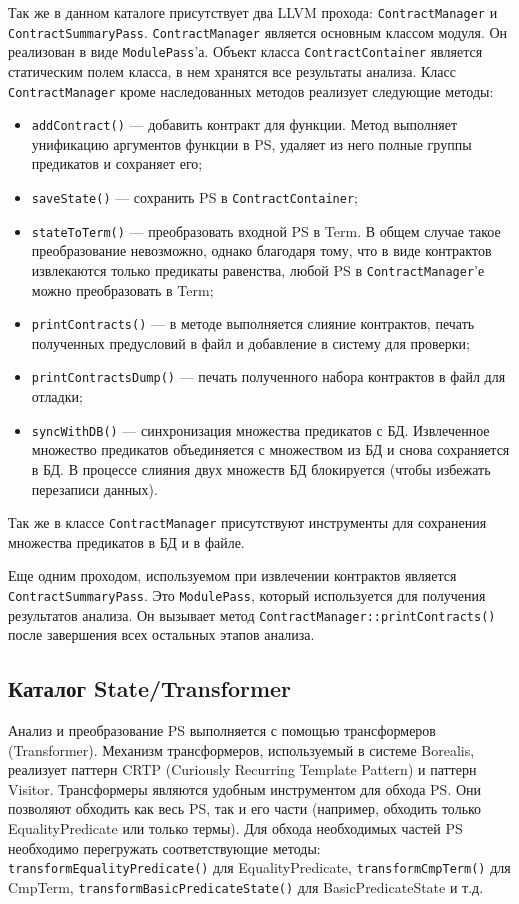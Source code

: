 Так же в данном каталоге присутствует два LLVM прохода: \texttt{ContractManager} и \texttt{ContractSummaryPass}. \texttt{ContractManager} является основным классом модуля. Он реализован в виде \texttt{ModulePass}'а. Объект класса \texttt{ContractContainer} является статическим полем класса, в нем хранятся все результаты анализа. Класс \texttt{ContractManager} кроме наследованных методов реализует следующие методы:
\begin{itemize}
\item \texttt{addContract()} --- добавить контракт для функции. Метод выполняет унификацию аргументов функции в PS, удаляет из него полные группы предикатов и сохраняет его;
\item \texttt{saveState()} --- сохранить PS в \texttt{ContractContainer};
\item \texttt{stateToTerm()} --- преобразовать входной PS в Term. В общем случае такое преобразование невозможно, однако благодаря тому, что в виде контрактов извлекаются только предикаты равенства, любой PS в \texttt{ContractManager}'е можно преобразовать в Term;
\item \texttt{printContracts()} --- в методе выполняется слияние контрактов, печать полученных предусловий в файл и добавление в систему для проверки;
\item \texttt{printContractsDump()} --- печать полученного набора контрактов в файл для отладки;
\item \texttt{syncWithDB()} --- синхронизация множества предикатов с БД. Извлеченное множество предикатов объединяется с множеством из БД и снова сохраняется в БД. В процессе слияния двух множеств БД блокируется (чтобы избежать перезаписи данных).
\end{itemize}

Так же в классе \texttt{ContractManager} присутствуют инструменты для сохранения множества предикатов в БД и в файле.

Еще одним проходом, используемом при извлечении контрактов является \texttt{ContractSummaryPass}. Это \texttt{ModulePass}, который используется для получения результатов анализа. Он вызывает метод \texttt{ContractManager::printContracts()} после завершения всех остальных этапов анализа.

\subsection{Каталог State/Transformer}
Анализ и преобразование PS выполняется с помощью трансформеров (Transformer). Механизм трансформеров, используемый в системе Borealis, реализует паттерн CRTP (Curiously Recurring Template Pattern)\cite{crtp} и паттерн Visitor\cite{patterns}. Трансформеры являются удобным инструментом для обхода PS. Они позволяют обходить как весь PS, так и его части (например, обходить только EqualityPredicate или только термы). Для обхода необходимых частей PS необходимо перегружать соответствующие методы: \texttt{transformEqualityPredicate()} для EqualityPredicate, \texttt{transformCmpTerm()} для CmpTerm, \texttt{transformBasicPredicateState()} для BasicPredicateState и т.д.

